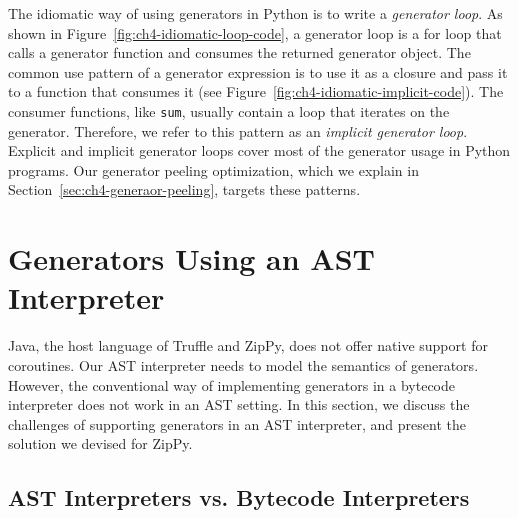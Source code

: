The idiomatic way of using generators in Python is to write a \emph{generator loop}.
As shown in Figure~\ref{fig:ch4-idiomatic-loop-code}, a generator loop is a for loop that calls a generator function and consumes the returned generator object.
The common use pattern of a generator expression is to use it as a closure and pass it to a function that consumes it (see Figure~\ref{fig:ch4-idiomatic-implicit-code}).
The consumer functions, like \texttt{sum}, usually contain a loop that iterates on the generator.
Therefore, we refer to this pattern as an \emph{implicit generator loop}.
Explicit and implicit generator loops cover most of the generator usage in Python programs.
Our generator peeling optimization, which we explain in Section~\ref{sec:ch4-generaor-peeling}, targets these patterns.

\section{Generators Using an AST Interpreter}

Java, the host language of Truffle and ZipPy, does not offer native support for coroutines.
Our AST interpreter needs to model the semantics of generators.
However, the conventional way of implementing generators in a bytecode interpreter does not work in an AST setting.
In this section, we discuss the challenges of supporting generators in an AST interpreter, and present the solution we devised for ZipPy.

\subsection{AST Interpreters vs. Bytecode Interpreters}

